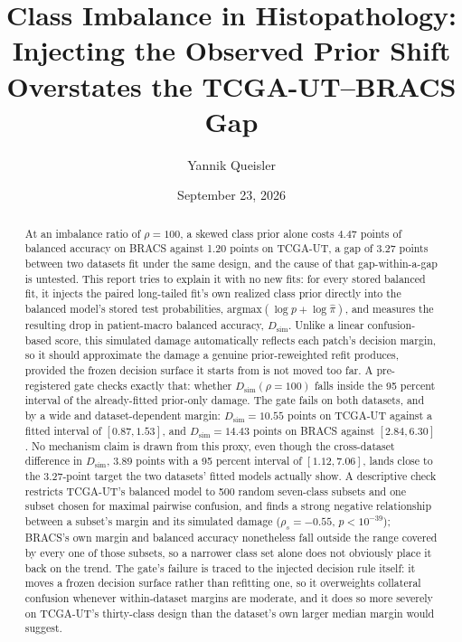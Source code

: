 \documentclass[11pt]{article}
\title{Class Imbalance in Histopathology:\\Injecting the Observed Prior Shift\\Overstates the {TCGA-UT}--{BRACS} Gap}
\author{Yannik Queisler}
\date{September 23, 2026}
\begin{document}
\raggedbottom
{}
\setlength{\emergencystretch}{2em}
\maketitle
\begin{abstract}
\noindent At an imbalance ratio of $\rho=100$, a skewed class prior alone costs 4.47 points of balanced accuracy on BRACS against 1.20 points on TCGA-UT, a gap of 3.27 points between two datasets fit under the same design, and the cause of that gap-within-a-gap is untested. This report tries to explain it with no new fits: for every stored balanced fit, it injects the paired long-tailed fit's own realized class prior directly into the balanced model's stored test probabilities, $\text{argmax}(\log p + \log \hat\pi)$, and measures the resulting drop in patient-macro balanced accuracy, $D_{\mathrm{sim}}$. Unlike a linear confusion-based score, this simulated damage automatically reflects each patch's decision margin, so it should approximate the damage a genuine prior-reweighted refit produces, provided the frozen decision surface it starts from is not moved too far. A pre-registered gate checks exactly that: whether $D_{\mathrm{sim}}(\rho=100)$ falls inside the 95 percent interval of the already-fitted prior-only damage. The gate fails on both datasets, and by a wide and dataset-dependent margin: $D_{\mathrm{sim}}=10.55$ points on TCGA-UT against a fitted interval of $[0.87, 1.53]$, and $D_{\mathrm{sim}}=14.43$ points on BRACS against $[2.84, 6.30]$. No mechanism claim is drawn from this proxy, even though the cross-dataset difference in $D_{\mathrm{sim}}$, 3.89 points with a 95 percent interval of $[1.12, 7.06]$, lands close to the 3.27-point target the two datasets' fitted models actually show. A descriptive check restricts TCGA-UT's balanced model to 500 random seven-class subsets and one subset chosen for maximal pairwise confusion, and finds a strong negative relationship between a subset's margin and its simulated damage ($\rho_s=-0.55$, $p<10^{-39}$); BRACS's own margin and balanced accuracy nonetheless fall outside the range covered by every one of those subsets, so a narrower class set alone does not obviously place it back on the trend. The gate's failure is traced to the injected decision rule itself: it moves a frozen decision surface rather than refitting one, so it overweights collateral confusion whenever within-dataset margins are moderate, and it does so more severely on TCGA-UT's thirty-class design than the dataset's own larger median margin would suggest.
\end{abstract}
\end{document}

